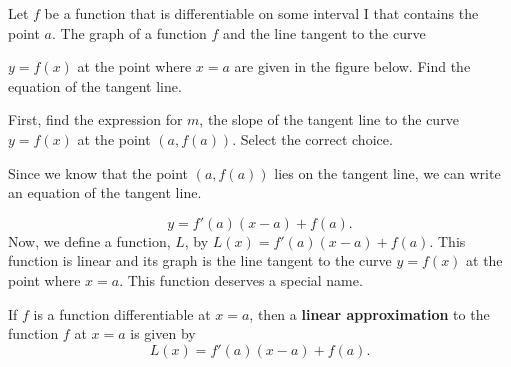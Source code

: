 \documentclass{ximera}
\begin{document}
\begin{example}
Let $f$ be a function that is differentiable on some interval I that contains the point $a$. The graph of a function $f$  and the line tangent to the curve

 $y=f(x)$ at the point where $x=a$ are given in the figure below.
Find the equation of the tangent line.
 \begin{image}
\end{image}
First, find the expression for $m$, the slope of the tangent line to the curve $y=f(x)$ at the point $(a,f(a))$.
 Select the correct choice.
 \begin{multipleChoice}
  \end{multipleChoice}
Since we know that the point $(a,f(a))$  lies on the tangent line,  we can write an equation of the tangent line. 

\[
y= f'(a)(x-a) +f(a).
\]
Now, we define a function, $L$,  by $L(x)= f'(a)(x-a) +f(a)$. This function is linear and its graph is the line tangent to the curve $y=f(x)$ at the point where $x=a$.
This function deserves a special name.
\end{example}
\begin{definition}
If $f$ is a function differentiable at $x=a$, then a \textbf{linear
  approximation} to the function $f$ at $x=a$ is given by
\[
L(x) = f'(a)(x-a) +f(a).
\]
\end{definition}
\end{document}
